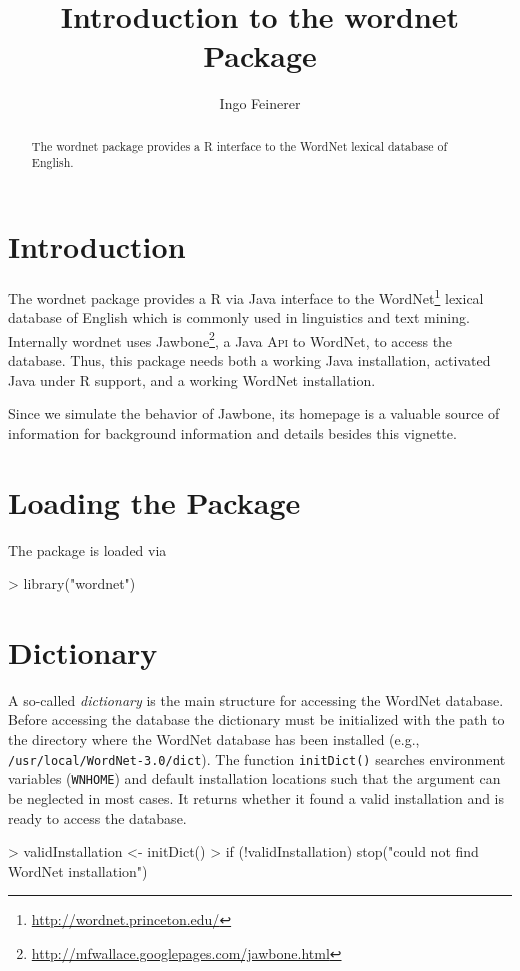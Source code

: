 \documentclass[a4paper]{article}
\newcommand{\strong}[1]{{\normalfont\fontseries{b}\selectfont #1}}
\newcommand{\code}[1]{\mbox{\texttt{#1}}}
\newcommand{\pkg}[1]{\strong{#1}}
\newcommand{\proglang}[1]{\textsf{#1}}
\newcommand{\acronym}[1]{\textsc{#1}}
\begin{document}
\title{Introduction to the \pkg{wordnet} Package}
\author{Ingo Feinerer}
\maketitle
\sloppy

\begin{abstract}
  The \pkg{wordnet} package provides a \proglang{R} interface to the
  \proglang{WordNet} lexical database of English.
\end{abstract}

\section*{Introduction}
The \pkg{wordnet} package provides a \proglang{R} via \proglang{Java}
interface to the
\proglang{WordNet}\footnote{\url{http://wordnet.princeton.edu/}}
lexical database of English which is commonly used in linguistics and
text mining. Internally \pkg{wordnet} uses
\proglang{Jawbone}\footnote{\url{http://mfwallace.googlepages.com/jawbone.html}},
a \proglang{Java} \acronym{Api} to \proglang{WordNet}, to access the
database. Thus, this package needs both a working \proglang{Java}
installation, activated \proglang{Java} under \proglang{R} support, and a
working \proglang{WordNet} installation.

Since we simulate the behavior of \proglang{Jawbone}, its homepage
is a valuable source of information for background information and
details besides this vignette.

\section*{Loading the Package}
The package is loaded via
\begin{Schunk}
\begin{Sinput}
> library("wordnet")
\end{Sinput}
\end{Schunk}

\section*{Dictionary}
A so-called \emph{dictionary} is the main structure for accessing the
\proglang{WordNet} database. Before accessing the database the
dictionary must be initialized with the path to the directory where
the \proglang{WordNet} database has been installed (e.g.,
\code{/usr/local/WordNet-3.0/dict}). The function \code{initDict()}
searches environment variables (\code{WNHOME}) and default
installation locations such that the argument can be neglected in most
cases. It returns whether it found a valid installation and is ready
to access the database.
\begin{Schunk}
\begin{Sinput}
> validInstallation <- initDict()
> if (!validInstallation) stop("could not find WordNet installation")
\end{Sinput}
\end{Schunk}
\end{document}
